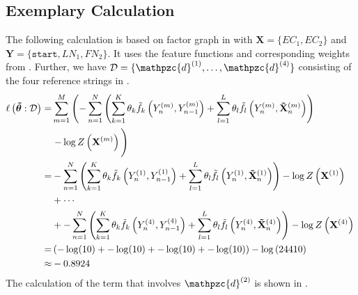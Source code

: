 \subsection{Exemplary Calculation}\label{app:subsec-llg-example-calculation}
The following calculation is based on \gls{factor graph} in  with $\mathbf{X}=\{EC_1,EC_2\}$ and $\mathbf{Y}=\{\texttt{start},LN_1,FN_2\}$.
It uses the \glspl{feature function} and corresponding weights from .
Further, we have $\mathcal{D}=\{\mathpzc{d}^{(1)},\dots,\mathpzc{d}^{(4)}\}$ consisting of the four reference strings in .
\begin{equation*}
  \begin{split}
    \ell\left(\bm{\tilde{\theta}}:\mathcal{D}\right) = & \sum_{m=1}^M \left(-\sum_{n=1}^N \left(\sum_{k=1}^K\theta_k \tilde{f}_k\left(Y_n^{(m)},Y_{n-1}^{(m)}\right)+\sum_{l=1}^L\theta_l \tilde{f}_l\left(Y_n^{(m)},\mathbf{\tilde{X}}_n^{(m)}\right)\right)\right. \\
    &\left.-\log Z\left(\mathbf{X}^{(m)}\right)\vphantom{\sum_{l=1}^L}\right)\\
   =&-\sum_{n=1}^N \left(\sum_{k=1}^K\theta_k \tilde{f}_k\left(Y_n^{(1)},Y_{n-1}^{(1)}\right)+\sum_{l=1}^L\theta_l \tilde{f}_l\left(Y_n^{(1)},\mathbf{\tilde{X}}_n^{(1)}\right)\right)-\log Z\left(\mathbf{X}^{(1)}\right)\vphantom{\sum_{l=1}^L}\\
   &+\cdots\\
   &+-\sum_{n=1}^N \left(\sum_{k=1}^K\theta_k \tilde{f}_k\left(Y_n^{(4)},Y_{n-1}^{(4)}\right)+\sum_{l=1}^L\theta_l \tilde{f}_l\left(Y_n^{(4)},\mathbf{\tilde{X}}_n^{(4)}\right)\right)-\log Z\left(\mathbf{X}^{(4)}\right)\vphantom{\sum_{l=1}^L}\\
    =&\left(-\log(10)+-\log(10)+-\log(10)+-\log(10)\right)-\log\left(24410\right)\\
    \approx&-0.8924
 \end{split}
\end{equation*}
The calculation of the term that involves $\mathpzc{d}^{(2)}$ is shown in .
